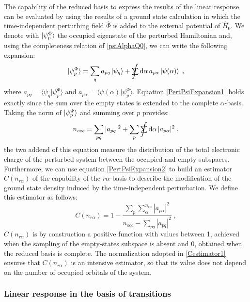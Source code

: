 \documentclass[a4paper]{article}
\newcommand{\dd}{{\rm d}}
\newcommand{\sint}{\mathrlap{\displaystyle\int}
\mathrlap{\textstyle\sum}
\phantom{\mathrlap{\displaystyle
\int}\textstyle\sum}}
\newcommand{\be}{\begin{equation}}
\newcommand{\ee}{\end{equation}}
\newcommand{\lb}{\label}
\newcommand{\op}[1]{\hat {#1}}
\newcommand{\brket}[2]{\langle  #1 | #2 \rangle} %
\newcommand{\hnot}{\op{H}_0}
\begin{document}
The capability of the reduced basis to express the results of the linear response can be evaluated by using the results of a ground state calculation in which the time-independent 
perturbing field $\op\Phi$ is added to the external potential of $\hnot$. We denote with $\ket{\psi_p^\Phi}$ the occupied eigenstate of the perturbed Hamiltonian and, using the 
completeness relation of \eqref{psiAlphaQ0}, we can write the following expansion:
\be\lb{PertPsiExpansion1}
\ket{\psi_p^{\Phi}} = \sum_q a_{pq}\ket{\psi_q} + \sint\dd\alpha \,a_{p\alpha}\ket{\psi(\alpha)} \;,
\ee
where $a_{pq} = \brket{\psi_q}{\psi_p^{\Phi}}$ and $a_{p\alpha} = \brket{\psi(\alpha)}{\psi_p^{\Phi}}$. Equation \eqref{PertPsiExpansion1} holds exactly since the sum over the empty states
is extended to the complete $\alpha$-basis. Taking the norm of $\ket{\psi_p^\Phi}$ and summing over $p$ provides:
\be\lb{PertPsiExpansion2}
n_{occ} = \sum_{pq} |a_{pq}|^2 + \sum_p\sint\dd\alpha\,|a_{p\alpha}|^2 \;,
\ee
the two addend of this equation measure the distribution of the total electronic charge of the perturbed system between the occupied and empty subspaces. Furthermore, we can use
equation \eqref{PertPsiExpansion2} to build an estimator $C(n_{r\alpha})$ of the capability of the $r\alpha$-basis to describe the modification of the ground state density induced 
by the time-independent perturbation. We define this estimator as follows:
\be\lb{Cestimator1}
C(n_{r\alpha}) = 1 - \frac{\sum_p\sum_\alpha^{n_{r\alpha}}|a_{p\alpha}|^2}{n_{occ} - \sum_{pq} |a_{pq}|^2} \;,
\ee
$C(n_{r\alpha})$ is by construction a positive function with values between 1, achieved when the sampling of the empty-states subspace is absent and 0, obtained when the reduced basis
is complete. The normalization adopted in \eqref{Cestimator1} ensures that $C(n_{r\alpha})$ is an intensive estimator, so that its value does not depend on the number of occupied
orbitals of the system. 

\subsubsection{Linear response in the basis of transitions}
\end{document}
